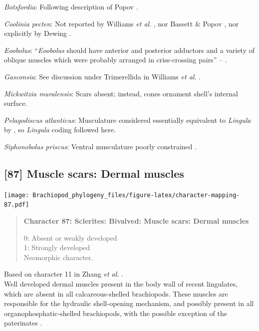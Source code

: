 \documentclass[openany]{book}
\begin{document}
\hypertarget{Botsfordia-coding-86}{}
\emph{Botsfordia}: Following description of Popov
\citeyearpar{Popov1992TheCambrian}.

\hypertarget{Coolinia_pecten-coding-86}{}
\emph{Coolinia pecten}: Not reported by Williams \emph{et al}.
\citeyearpar{Williams2000LinguliformeaCraniiformea}, nor Bassett \&
Popov \citeyearpar{Bassett2017Earliestontogeny}, nor explicitly by
Dewing \citeyearpar{Dewing2001Hingemodifications}.

\hypertarget{Eoobolus-coding-86}{}
\emph{Eoobolus}: ``\emph{Eoobolus} should have anterior and posterior
adductors and a variety of oblique muscles which were probably arranged
in criss-crossing pairs'' -- \citet{Balthasar2009Thebrachiopod}.

\hypertarget{Gasconsia-coding-86}{}
\emph{Gasconsia}: See discussion under Trimerellida in Williams \emph{et
al}. \citeyearpar{Williams2000LinguliformeaCraniiformea}.

\hypertarget{Mickwitzia_muralensis-coding-86}{}
\emph{Mickwitzia muralensis}: Scars absent; instead, cones ornament
shell's internal surface.

\hypertarget{Pelagodiscus_atlanticus-coding-86}{}
\emph{Pelagodiscus atlanticus}: Musculature considered essentially
equivalent to \emph{Lingula} by
\citet{Williams2000LinguliformeaCraniiformea}, so \emph{Lingula} coding
followed here.

\hypertarget{Siphonobolus_priscus-coding-86}{}
\emph{Siphonobolus priscus}: Ventral musculature poorly constrained
\citep{Williams2000LinguliformeaCraniiformea, Popov2009Earlyontogeny}.

\subsection*{{[}87{]} Muscle scars: Dermal
muscles}\label{muscle-scars-dermal-muscles}

\texttt{[image: Brachiopod\_phylogeny\_files/figure-latex/character-mapping-87.pdf]}

\begin{quote}
\textbf{Character 87: Sclerites: Bivalved: Muscle scars: Dermal muscles}

0: Absent or weakly developed\\
1: Strongly developed\\
Neomorphic character.
\end{quote}

Based on character 11 in Zhang \emph{et al}.
\citeyearpar{Zhang2014Anearly}.\\
Well developed dermal muscles present in the body wall of recent
lingulates, which are absent in all calcareous-shelled brachiopods.
These muscles are responsible for the hydraulic shell-opening mechanism,
and possibly present in all organophosphatic-shelled brachiopods, with
the possible exception of the paterinates
\citep[p.~32]{Williams2000LinguliformeaCraniiformea}.
\end{document}
